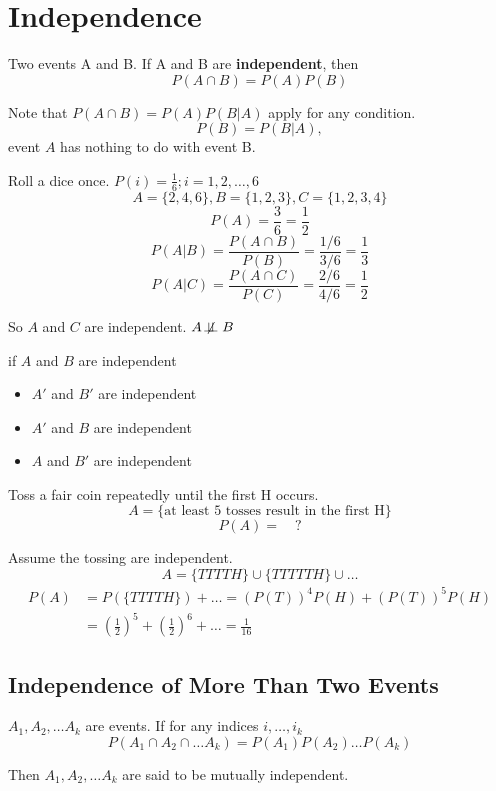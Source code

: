 \section{Independence}
\begin{defn}
Two events A and B. If A and B are \textbf{independent}, then
\[P(A\cap B)=P(A)P(B) \]

Note that $P(A \cap B)=P(A)P(B|A)$ apply for any condition.
\[  P(B)=P(B|A), \]
event $A$ has nothing to do with event B.
\end{defn}

\begin{exmp}
  Roll a dice once. $P(i)=\frac{1}{6}; i=1,2,\dots,6$
  \[  A=\{2,4,6\},   B=\{1,2,3\},   C=\{1,2,3,4\} \]
  \[  P(A)=\frac{3}{6}=\frac{1}{2} \]
  \[ P(A|B)=\frac{P(A\cap B)}{P(B)}=\frac{1/6}{3/6}=\frac{1}{3} \]
  \[ P(A|C)=\frac{P(A\cap C)}{P(C)}=\frac{2/6}{4/6}=\frac{1}{2} \]

So $A$ and $C$ are independent. $A \not\!\perp\!\!\!\perp B$
\end{exmp}

\begin{prop}
if $A$ and $B$ are independent
\begin{itemize}
  \item $A'$ and $B'$ are independent
  \item $A'$ and $B$ are independent
  \item $A$ and $B'$ are independent
\end{itemize}
\end{prop}

\begin{exmp}
  Toss a fair coin repeatedly until the first H occurs.
  \[A=\{\text{at least 5 tosses result in the first H}\}\]
  \[P(A)= \quad ?\]
	 
Assume the tossing are independent.
\[A=\{TTTTH\}\cup	\{TTTTTH\} \cup \dots	\]
\begin{align*}
P(A)&=P(\{TTTTH\})+\dots =(P(T))^4 P(H)+(P(T))^5 P(H)\\
&=\left(\frac{1}{2}\right)^5+\left(\frac{1}{2}\right)^6+\dots=\frac{1}{16}
\end{align*}
\end{exmp}

\subsection{Independence of More Than Two Events}
\begin{defn}
$A_1,A_2,\dots A_k$ are events. If for any indices $i,\dots, i_k$
\[P(A_1 \cap A_2 \cap \dots A_k)=P(A_1)P(A_2)\dots P(A_k)\]

Then $A_1,A_2,\dots A_k$ are said to be mutually independent.
\end{defn}

